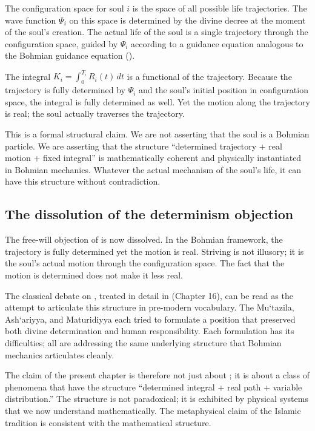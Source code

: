 \begin{conceptbox}
\label{conc:bohmian-rizq}
The configuration space for soul $i$ is the space of all possible
life trajectories. The wave function $\Psi_i$ on this space is
determined by the divine decree at the moment of the soul's
creation. The actual life of the soul is a single trajectory through
the configuration space, guided by $\Psi_i$ according to a
guidance equation analogous to the Bohmian guidance equation
().

The integral $K_i = \int_0^{T_i} R_i(t)\, dt$ is a functional of
the trajectory. Because the trajectory is fully determined by
$\Psi_i$ and the soul's initial position in configuration space,
the integral is fully determined as well. Yet the motion along the
trajectory is real; the soul actually traverses the trajectory.
\end{conceptbox}

This is a formal structural claim. We are not asserting that the
soul is a Bohmian particle. We are asserting that the structure
``determined trajectory + real motion + fixed integral'' is
mathematically coherent and physically instantiated in Bohmian
mechanics. Whatever the actual mechanism of the soul's life, it
can have this structure without contradiction.

\subsection{The dissolution of the determinism objection}

The free-will objection of  is now
dissolved. In the Bohmian framework, the trajectory is fully
determined yet the motion is real. Striving is not illusory; it is
the soul's actual motion through the configuration space. The fact
that the motion is determined does not make it less real.

The classical  debate on , treated in detail
in  (Chapter 16), can be read as the attempt to
articulate this structure in pre-modern vocabulary. The Mu`tazila,
Ash`ariyya, and Maturidiyya each tried to formulate a position that
preserved both divine determination and human responsibility. Each
formulation has its difficulties; all are addressing the same
underlying structure that Bohmian mechanics articulates cleanly.

The claim of the present chapter is therefore not just about
; it is about a class of phenomena that have the
structure ``determined integral + real path + variable
distribution.'' The structure is not paradoxical; it is exhibited
by physical systems that we now understand mathematically. The
metaphysical claim of the Islamic tradition is consistent with the
mathematical structure.

